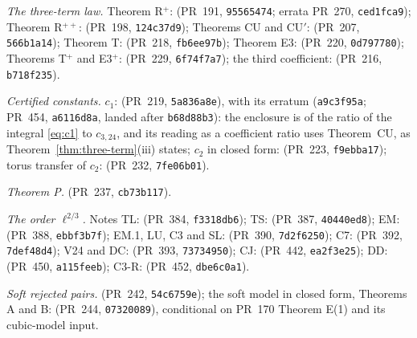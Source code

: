 {\begin{enumerate}[label={[R\arabic*]}, ref={R\arabic*}, leftmargin=3.2em, itemsep=2pt]
\item\label{rec:chain} \emph{The three-term law.} Theorem R$^+$:  (PR~191, \texttt{95565474}; errata PR~270, \texttt{ced1fca9}); Theorem R$^{++}$:  (PR~198, \texttt{124c37d9}); Theorems CU and CU$'$:  (PR~207, \texttt{566b1a14}); Theorem T:  (PR~218, \texttt{fb6ee97b}); Theorem E3:  (PR~220, \texttt{0d797780}); Theorems T$^+$ and E3$^+$:  (PR~229, \texttt{6f74f7a7}); the third coefficient:  (PR~216, \texttt{b718f235}).
\item\label{rec:consts} \emph{Certified constants.} $c_1$:  (PR~219, \texttt{5a836a8e}), with its erratum  (\texttt{a9c3f95a}; PR~454, \texttt{a6116d8a}, landed after \texttt{b68d88b3}): the enclosure is of the ratio of the integral \eqref{eq:c1} to $c_{3,24}$, and its reading as a coefficient ratio uses Theorem~CU, as Theorem~\ref{thm:three-term}(iii) states; $c_2$ in closed form:  (PR~223, \texttt{f9ebba17}); torus transfer of $c_2$:  (PR~232, \texttt{7fe06b01}).
\item\label{rec:parity} \emph{Theorem P.}  (PR~237, \texttt{cb73b117}).
\item\label{rec:twothirds} \emph{The order $\ell^{2/3}$.} Notes TL:  (PR~384, \texttt{f3318db6}); TS:  (PR~387, \texttt{40440ed8}); EM:  (PR~388, \texttt{ebbf3b7f}); EM.1, LU, C3 and SL:  (PR~390, \texttt{7d2f6250}); C7:  (PR~392, \texttt{7def48d4}); V24 and DC:  (PR~393, \texttt{73734950}); CJ:  (PR~442, \texttt{ea2f3e25}); DD:  (PR~450, \texttt{a115feeb}); C3-R:  (PR~452, \texttt{dbe6c0a1}).
\item\label{rec:soft} \emph{Soft rejected pairs.}  (PR~242, \texttt{54c6759e}); the soft model in closed form, Theorems A and B:  (PR~244, \texttt{07320089}), conditional on PR~170 Theorem E(1) and its cubic-model input.

\end{enumerate}}
